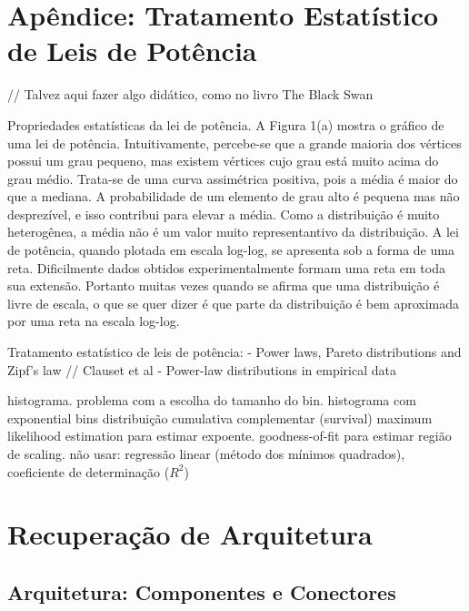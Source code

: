 \documentclass{article}
\begin{document}

\section{Apêndice: Tratamento Estatístico de Leis de Potência} \label{sec:estatistica}

// Talvez aqui fazer algo didático, como no livro The Black Swan

Propriedades estatísticas da lei de potência. A Figura 1(a) mostra o gráfico de uma lei de potência. Intuitivamente, percebe-se que a grande maioria dos vértices possui um grau pequeno, mas existem vértices cujo grau está muito acima do grau médio. Trata-se de uma curva assimétrica positiva, pois a média é maior do que a mediana. A probabilidade de um elemento de grau alto é pequena mas não desprezível, e isso contribui para elevar a média. Como a distribuição é muito heterogênea, a média não é um valor muito representantivo da distribuição. A lei de potência, quando plotada em escala log-log, se apresenta sob a forma de uma reta. Dificilmente dados obtidos experimentalmente formam uma reta em toda sua extensão. Portanto muitas vezes quando se afirma que uma distribuição é livre de escala, o que se quer dizer é que parte da distribuição é bem aproximada por uma reta na escala log-log.

Tratamento estatístico de leis de potência:  \cite{Newman2005} - Power laws, Pareto distributions and Zipf's law   //   Clauset et al - Power-law distributions in empirical data \cite{Clauset2007}

histograma. problema com a escolha do tamanho do bin. histograma com exponential bins
distribuição cumulativa complementar (survival)
maximum likelihood estimation para estimar expoente.
goodness-of-fit para estimar região de scaling.
não usar: regressão linear (método dos mínimos quadrados), coeficiente de determinação ($R^2$)



\section{Recuperação de Arquitetura}

\subsection{Arquitetura: Componentes e Conectores}
\end{document}

